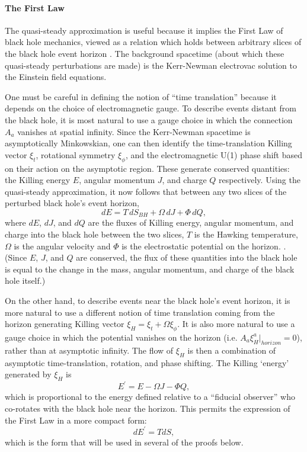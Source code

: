 \documentclass[12pt]{article}
\begin{document}
\paragraph{The First Law}

The quasi-steady approximation is useful because it implies the First Law \cite{BCH73}\cite{GW01} of black hole mechanics, viewed as a relation which holds between arbitrary slices of the black hole event horizon \cite{SCD81}\cite{JP03}.  The background spacetime (about which these quasi-steady perturbations are made) is the Kerr-Newman electrovac solution to the Einstein field equations.

One must be careful in defining the notion of ``time translation'' because it depends on the choice of electromagnetic gauge.  To describe events distant from the black hole, it is most natural to use a gauge choice in which the connection $A_a$ vanishes at spatial infinity.  Since the Kerr-Newman spacetime is asymptotically Minkowskian, one can then identify the time-translation Killing vector $\xi_t$, rotational symmetry $\xi_{\phi}$, and the electromagnetic U(1) phase shift based on their action on the asymptotic region.  These generate conserved quantities: the Killing energy $E$, angular momentum $J$, and charge $Q$ respectively.  Using the quasi-steady approximation, it now follows that between any two slices of the perturbed black hole's event horizon,
\begin{equation}\label{FIRST}
dE = T\,dS_{BH} + \Omega\,dJ + \Phi\,dQ,
\end{equation}
where $dE$, $dJ$, and $dQ$ are the fluxes of Killing energy, angular momentum, and charge into the black hole between the two slices, $T$ is the Hawking temperature, $\Omega$ is the angular velocity and $\Phi$ is the electrostatic potential on the horizon. \cite{SCD81}\cite{GW01}.  (Since $E$, $J$, and $Q$ are conserved, the flux of these quantities into the black hole is equal to the change in the mass, angular momentum, and charge of the black hole itself.)

On the other hand, to describe events near the black hole's event horizon, it is more natural to use a different notion of time translation coming from the horizon generating Killing vector $\xi_H = \xi_t + \Omega \xi_{\phi}$.  It is also more natural to use a gauge choice in which the potential vanishes on the horizon (i.e. $A_a \xi^a_H|_{horizon} = 0$), rather than at asymptotic infinity.  The flow of $\xi_H$ is then a combination of asymptotic time-translation, rotation, and phase shifting.  The Killing `energy' generated by $\xi_{H}$ is
\begin{equation}
E^{\prime} = E - \Omega J - \Phi Q,
\end{equation}
which is proportional to the energy defined relative to a ``fiducial observer'' who co-rotates with the black hole near the horizon.  This permits the expression of the First Law in a more compact form:
\begin{equation}\label{first}
dE^{\prime} = T dS,
\end{equation}
which is the form that will be used in several of the proofs below.
\end{document}
